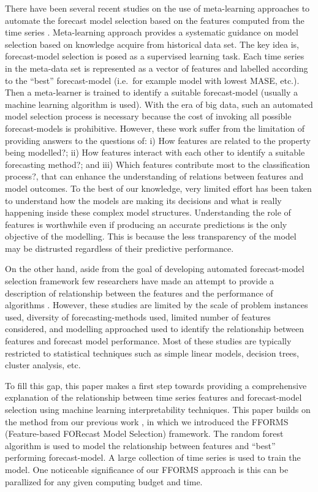 \documentclass[11pt,a4paper,]{article}
\begin{document}
There have been several recent studies on the use of meta-learning
approaches to automate the forecast model selection based on the
features computed from the time series
\autocites{shah1997model}{prudencio2004meta}{lemke2010meta}{kuck2016meta}.
Meta-learning approach provides a systematic guidance on model selection
based on knowledge acquire from historical data set. The key idea is,
forecast-model selection is posed as a supervised learning task. Each
time series in the meta-data set is represented as a vector of features
and labelled according to the ``best'' forecast-model (i.e.~for example
model with lowest MASE, etc.). Then a meta-learner is trained to
identify a suitable forecast-model (usually a machine learning algorithm
is used). With the era of big data, such an automated model selection
process is necessary because the cost of invoking all possible
forecast-models is prohibitive. However, these work suffer from the
limitation of providing answers to the questions of: i) How features are
related to the property being modelled?; ii) How features interact with
each other to identify a suitable forecasting method?; and iii) Which
features contribute most to the classification process?, that can
enhance the understanding of relations between features and model
outcomes. To the best of our knowledge, very limited effort has been
taken to understand how the models are making its decisions and what is
really happening inside these complex model structures. Understanding
the role of features is worthwhile even if producing an accurate
predictions is the only objective of the modelling. This is because the
less transparency of the model may be distrusted regardless of their
predictive performance.

On the other hand, aside from the goal of developing automated
forecast-model selection framework few researchers have made an attempt
to provide a description of relationship between the features and the
performance of algorithms
\autocites{schnaars1984situational}{wang2009rule}{lemke2010meta}{petropoulos2014horses}.
However, these studies are limited by the scale of problem instances
used, diversity of forecasting-methods used, limited number of features
considered, and modelling approached used to identify the relationship
between features and forecast model performance. Most of these studies
are typically restricted to statistical techniques such as simple linear
models, decision trees, cluster analysis, etc.

To fill this gap, this paper makes a first step towards providing a
comprehensive explanation of the relationship between time series
features and forecast-model selection using machine learning
interpretability techniques. This paper builds on the method from our
previous work \textcite{fforms}, in which we introduced the FFORMS
(Feature-based FORecast Model Selection) framework. The random forest
algorithm is used to model the relationship between features and
``best'' performing forecast-model. A large collection of time series is
used to train the model. One noticeable significance of our FFORMS
approach is this can be parallized for any given computing budget and
time.
\end{document}
